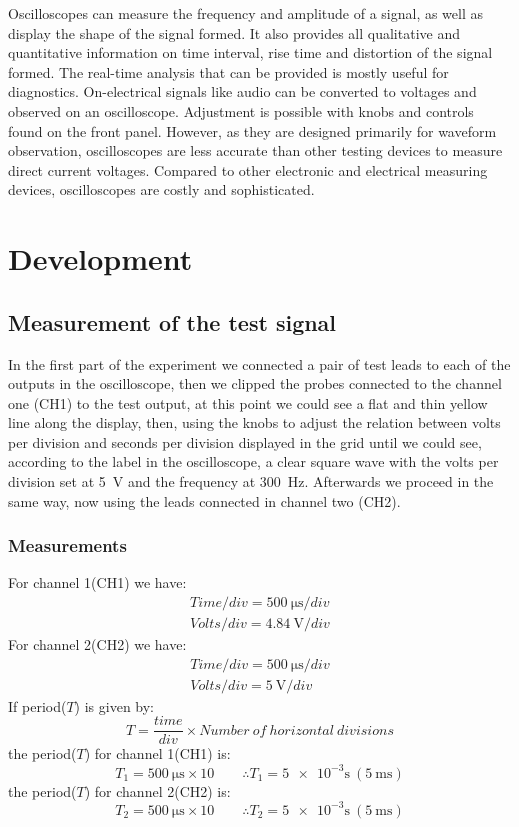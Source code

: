 \documentclass[letterpaper]{article}
\begin{document}
    Oscilloscopes can measure the frequency and amplitude of a signal, as well as display the shape of the signal formed. It also provides all qualitative and quantitative information on time interval, rise time and distortion of the signal formed. The real-time analysis that can be provided is mostly useful for diagnostics. On-electrical signals like audio can be converted to voltages and observed on an oscilloscope. Adjustment is possible with knobs and controls found on the front panel. 
However, as they are designed primarily for waveform observation, oscilloscopes are less accurate than other testing devices to measure direct current voltages. Compared to other electronic and electrical measuring devices, oscilloscopes are costly and sophisticated. 
\newpage
\section{Development}
\subsection{Measurement of the test signal}
In the first part of the experiment we connected a pair of test leads to each of the outputs in the
oscilloscope, then we clipped the probes connected to the channel one (CH1) to the test output,
at this point we could see a flat and thin yellow line along the display, then, using the knobs to
adjust the relation between volts per division and seconds per division displayed in the grid until we could see,
according to the label in the oscilloscope, a clear square wave with the volts per division
set at \SI{5}{\volt} and the frequency at \SI{300}{\hertz}. Afterwards we proceed in the same
way, now using the leads connected in channel two (CH2).
\subsubsection{Measurements}
For channel 1(CH1) we have:
\begin{gather*}
    Time/div = \SI{500}{\micro\second}/div\\
    Volts/div = \SI{4.84}{\volt}/div
\end{gather*}
For channel 2(CH2) we have:
\begin{gather*}
    Time/div = \SI{500}{\micro\second}/div\\
    Volts/div = \SI{5}{\volt}/div
\end{gather*}
If period($T$) is given by:
\[T = \frac{time}{div}\times Number\ of\ horizontal\ divisions\]
the period($T$) for channel 1(CH1) is:
\[T_1 = \SI{500}{\micro\second}\times10\qquad\therefore T_1 = \num{5e-3}\si{\second}\ (\SI{5}{\milli\second})\]
the period($T$) for channel 2(CH2) is:
\[T_2 = \SI{500}{\micro\second}\times10\qquad\therefore T_2 = \num{5e-3}\si{\second}\ (\SI{5}{\milli\second})\]
\end{document}
